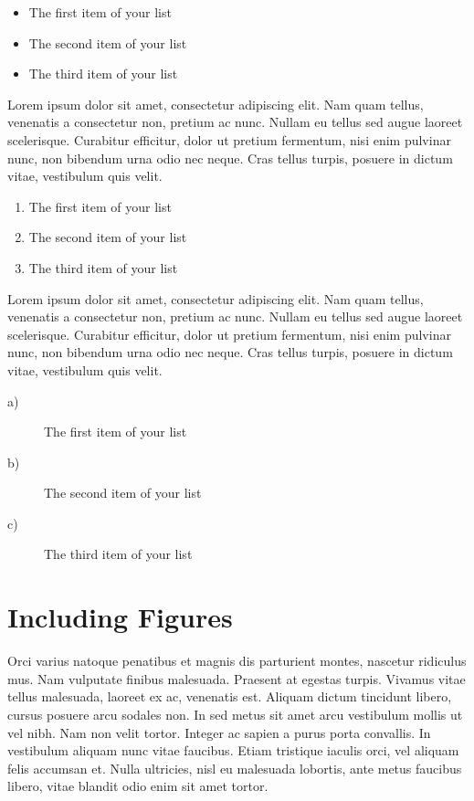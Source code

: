\begin{itemize}
    \item The first item of your list
    \item The second item of your list
    \item The third item of your list
\end{itemize}

Lorem ipsum dolor sit amet, consectetur adipiscing elit. Nam quam tellus, venenatis a consectetur non, pretium ac nunc. Nullam eu tellus sed augue laoreet scelerisque. Curabitur efficitur, dolor ut pretium fermentum, nisi enim pulvinar nunc, non bibendum urna odio nec neque. Cras tellus turpis, posuere in dictum vitae, vestibulum quis velit.

\begin{enumerate}
    \item The first item of your list
    \item The second item of your list
    \item The third item of your list
\end{enumerate}

Lorem ipsum dolor sit amet, consectetur adipiscing elit. Nam quam tellus, venenatis a consectetur non, pretium ac nunc. Nullam eu tellus sed augue laoreet scelerisque. Curabitur efficitur, dolor ut pretium fermentum, nisi enim pulvinar nunc, non bibendum urna odio nec neque. Cras tellus turpis, posuere in dictum vitae, vestibulum quis velit. 

\begin{description}
    \item[a)] The first item of your list
    \item[b)] The second item of your list
    \item[c)] The third item of your list
\end{description}
 

\section{Including Figures}
Orci varius natoque penatibus et magnis dis parturient montes, nascetur ridiculus mus. Nam vulputate finibus malesuada. Praesent at egestas turpis. Vivamus vitae tellus malesuada, laoreet ex ac, venenatis est. Aliquam dictum tincidunt libero, cursus posuere arcu sodales non. In sed metus sit amet arcu vestibulum mollis ut vel nibh. Nam non velit tortor. Integer ac sapien a purus porta convallis. In vestibulum aliquam nunc vitae faucibus. Etiam tristique iaculis orci, vel aliquam felis accumsan et. Nulla ultricies, nisl eu malesuada lobortis, ante metus faucibus libero, vitae blandit odio enim sit amet tortor.

